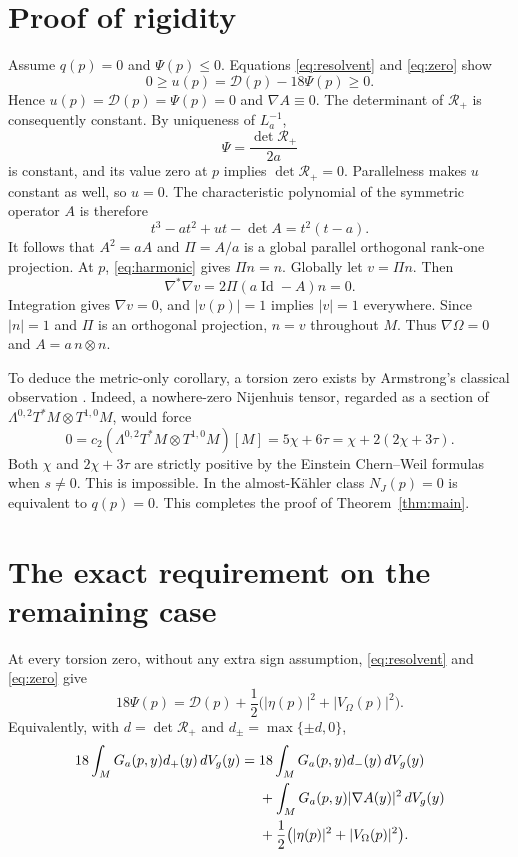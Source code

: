 \documentclass[11pt]{article}
\theoremstyle{remark}\newtheorem{remark}[theorem]{Remark}
\newcommand{\Id}{\operatorname{Id}}
\newcommand{\RR}{\mathcal R_+}
\begin{document}
\section{Proof of rigidity}
Assume $q(p)=0$ and $\Psi(p)\le0$. Equations \eqref{eq:resolvent}
and \eqref{eq:zero} show
\[
 0\ge u(p)=\mathcal D(p)-18\Psi(p)\ge0.
\]
Hence $u(p)=\mathcal D(p)=\Psi(p)=0$ and $\nabla A\equiv0$.
The determinant of $\RR$ is consequently constant. By uniqueness of
$L_a^{-1}$,
\[
 \Psi=\frac{\det\RR}{2a}
\]
is constant, and its value zero at $p$ implies $\det\RR=0$.
Parallelness makes $u$ constant as well, so $u=0$. The characteristic
polynomial of the symmetric operator $A$ is therefore
\[
 t^3-at^2+u t-\det A=t^2(t-a).
\]
It follows that $A^2=aA$ and $\Pi=A/a$ is a global parallel orthogonal
rank-one projection. At $p$, \eqref{eq:harmonic} gives $\Pi n=n$.
Globally let $v=\Pi n$. Then
\[
 \nabla^*\nabla v=2\Pi(a\Id-A)n=0.
\]
Integration gives $\nabla v=0$, and $|v(p)|=1$ implies $|v|=1$ everywhere.
Since $|n|=1$ and $\Pi$ is an orthogonal projection, $n=v$ throughout
$M$. Thus $\nabla\Omega=0$ and $A=a\,n\otimes n$.

To deduce the metric-only corollary, a torsion zero exists by Armstrong's
classical observation \cite[Theorem 2.2.4]{Armstrong}. Indeed, a nowhere-zero
Nijenhuis tensor, regarded as a section of
$\Lambda^{0,2}T^*M\otimes T^{1,0}M$, would force
\[
 0=c_2(\Lambda^{0,2}T^*M\otimes T^{1,0}M)[M]
   =5\chi+6\tau=\chi+2(2\chi+3\tau).
\]
Both $\chi$ and $2\chi+3\tau$ are strictly positive by the Einstein
Chern--Weil formulas when $s\ne0$. This is impossible. In the
almost-K\"ahler class $N_J(p)=0$ is equivalent to $q(p)=0$.
This completes the proof of Theorem~\ref{thm:main}.

\section{The exact requirement on the remaining case}
At every torsion zero, without any extra sign assumption,
\eqref{eq:resolvent} and \eqref{eq:zero} give
\begin{equation}\label{eq:balance}
 \boxed{
 18\Psi(p)=\mathcal D(p)
       +\frac12\bigl(|\eta(p)|^2+|V_\Omega(p)|^2\bigr).
 }
\end{equation}
Equivalently, with $d=\det\RR$ and $d_\pm=\max\{\pm d,0\}$,
\begin{align}\label{eq:signed}
 18\int_M G_a(p,y)d_+(y)\,dV_g(y)
 ={}&18\int_M G_a(p,y)d_-(y)\,dV_g(y)\notag\\
 &+\int_MG_a(p,y)|\nabla A(y)|^2\,dV_g(y)\notag\\
 &+\frac12\bigl(|\eta(p)|^2+|V_\Omega(p)|^2\bigr).
\end{align}
\end{document}
